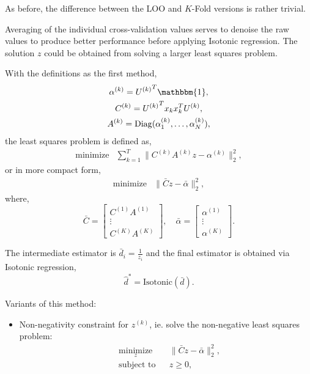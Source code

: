 \documentclass{article}
\begin{document}
\begin{enumerate}
As before, the difference between the LOO and $K$-Fold versions is rather
trivial.

Averaging of the individual cross-validation values serves to denoise the raw
values to produce better performance before applying Isotonic regression.  The
solution $z$ could be obtained from solving a larger least squares problem.

With the definitions as the first method,
\begin{gather*} 
	\alpha^{(k)} = {U^{(k)}}^T\mathbbm{1}, \\
	C^{(k)} = {U^{(k)}}^T x_k x_k^T U^{(k)}, \\
	A^{(k)} = \mathrm{Diag}(\alpha^{(k)}_1, \ldots, \alpha^{(k)}_N),
\end{gather*}
the least squares problem is defined as,
\begin{equation}\label{eq:minvar_loo_lsq}
	\begin{array}{ll}
		\mbox{minimize} & \sum_{k=1}^T \| C^{(k)} A^{(k)} z - \alpha^{(k)} \|_2^2,
	\end{array}
\end{equation}
or in more compact form,
\begin{equation*}
	\begin{array}{ll}
		\mbox{minimize} & \| \bar{C} z - \bar{\alpha} \|_2^2,
	\end{array}
\end{equation*}
where,
$$
  \bar{C}
    = \begin{bmatrix} C^{(1)} A^{(1)} \\ \vdots \\ C^{(K)} A^{(K)}\end{bmatrix},
  \quad \bar{\alpha}
    = \begin{bmatrix} \alpha^{(1)} \\ \vdots \\ \alpha^{(K)}\end{bmatrix}.
$$

The intermediate estimator is $\bar{d}_i = \frac{1}{z_i}$ and the final
estimator is obtained via Isotonic regression,
$$
	\hat{d}^* = \mathrm{Isotonic}(\bar{d}).
$$

Variants of this method:
\begin{itemize}
	\item Non-negativity constraint for $z^{(k)}$, ie. solve the non-negative
	least squares problem:
	\begin{equation*}
	  \begin{aligned}
	    & \underset{z}{\text{minimize}}
	    & & \| \bar{C} z - \bar{\alpha} \|_2^2, \\
	    & \text{subject to}
	    & & z \geq 0,
	  \end{aligned}
	\end{equation*}
	

\end{itemize}
\end{enumerate}
\end{document}
